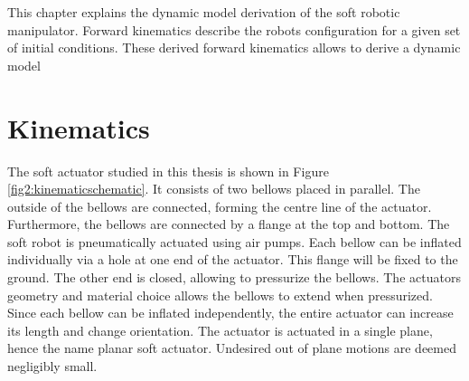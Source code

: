 This chapter explains the dynamic model derivation of the soft robotic manipulator. Forward kinematics describe the robots configuration for a given set of initial conditions. These derived forward kinematics allows to derive a dynamic model 



\section{Kinematics}

The soft actuator studied in this thesis is shown in Figure \ref{fig2:kinematicschematic}. It consists of two bellows placed in parallel. The outside of the bellows are connected, forming the centre line of the actuator. Furthermore, the bellows are connected by a flange at the top and bottom. The soft robot is pneumatically actuated using air pumps. Each bellow can be inflated individually via a hole at one end of the actuator. This flange will be fixed to the ground. The other end is closed, allowing to pressurize the bellows. The actuators geometry and material choice allows the bellows to extend when pressurized. Since each bellow can be inflated independently, the entire actuator can increase its length and change orientation. The actuator is actuated in a single plane, hence the name planar soft actuator. Undesired out of plane motions are deemed negligibly small.

